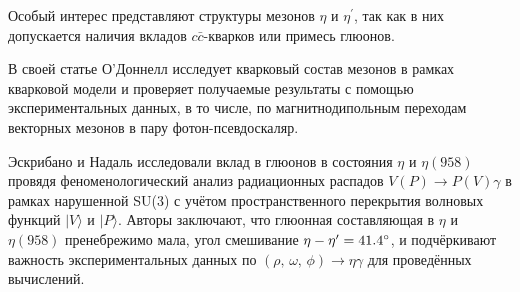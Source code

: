 %		    

Особый интерес представляют структуры мезонов $\eta$ и $\eta^\prime$, так как в них допускается наличия вкладов $c\bar{c}$-кварков или примесь глюонов. 

В своей статье О'Доннелл \cite{ODonnell:1981sj} исследует кварковый состав мезонов в
рамках кварковой модели и проверяет получаемые результаты с помощью
экспериментальных данных, в то числе, по магнитнодипольным переходам
векторных мезонов в пару фотон-псевдоскаляр.


Эскрибано и Надаль \cite{Escribano:2007cd} исследовали вклад в глюонов в состояния $\eta$
и $\eta(958)$ провядя феноменологический анализ радиационных распадов
$V (P) \to P (V) \gamma$ в рамках нарушенной SU(3) с учётом
пространственного перекрытия волновых функций $| V \rangle$ и
$|P \rangle$. Авторы заключают, что глюонная составляющая в $\eta$ и
$\eta(958)$ пренебрежимо мала, угол смешивание
$\eta-\eta^\prime = \ang{41.4 \pm 1.3}$, и подчёркивают важность
экспериментальных данных по $(\rho, \, \omega, \, \phi ) \to \eta \gamma$ для
проведённых вычислений.

